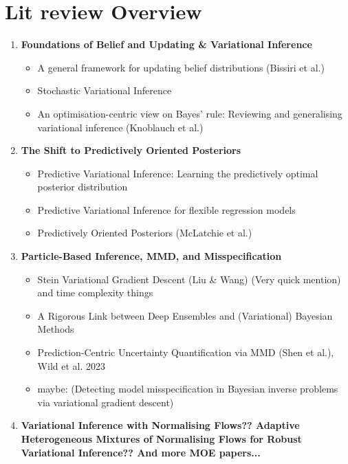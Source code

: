 \documentclass[11pt,a4paper]{article}
\begin{document}
\section*{Lit review Overview}
\begin{enumerate}
    \item \textbf{Foundations of Belief and Updating \& Variational Inference}
          \begin{itemize}
              \item A general framework for updating belief distributions (Bissiri et al.)
              \item Stochastic Variational Inference
              \item An optimisation-centric view on Bayes' rule: Reviewing and generalising variational inference (Knoblauch et al.)
          \end{itemize}

    \item \textbf{The Shift to Predictively Oriented Posteriors}
          \begin{itemize}
              \item Predictive Variational Inference: Learning the predictively optimal posterior distribution
              \item Predictive Variational Inference for flexible regression models
              \item Predictively Oriented Posteriors (McLatchie et al.)
          \end{itemize}

    \item \textbf{Particle-Based Inference, MMD, and Misspecification}
          \begin{itemize}
              \item Stein Variational Gradient Descent (Liu \& Wang) (Very quick mention) and time complexity things
              \item A Rigorous Link between Deep Ensembles and (Variational) Bayesian Methods
              \item Prediction-Centric Uncertainty Quantification via MMD (Shen et al.), Wild et al. 2023
              \item maybe: (Detecting model misspecification in Bayesian inverse problems via variational gradient descent)
          \end{itemize}
    \item \textbf{Variational Inference with Normalising Flows?? Adaptive Heterogeneous Mixtures of Normalising Flows for Robust Variational Inference?? And more MOE papers...}
\end{enumerate}
\end{document}
